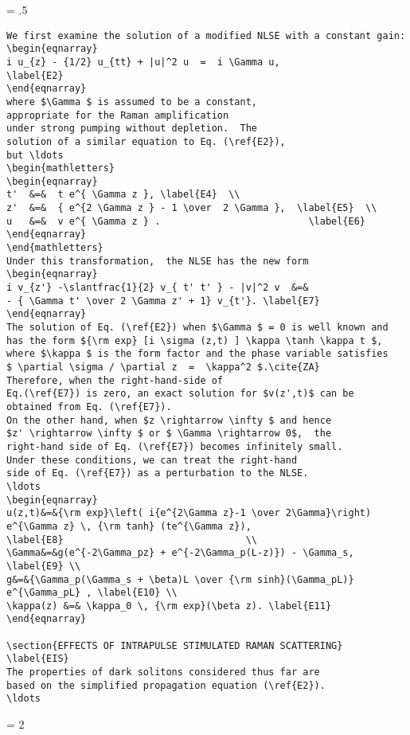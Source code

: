 \newpage
\baselineskip = .5\baselineskip  %
\begin{verbatim}
We first examine the solution of a modified NLSE with a constant gain:
\begin{eqnarray}
i u_{z} - {1/2} u_{tt} + |u|^2 u  =  i \Gamma u,
\label{E2}
\end{eqnarray}
where $\Gamma $ is assumed to be a constant,
appropriate for the Raman amplification
under strong pumping without depletion.  The
solution of a similar equation to Eq. (\ref{E2}),
but \ldots
\begin{mathletters}
\begin{eqnarray}
t'  &=&  t e^{ \Gamma z }, \label{E4}  \\
z'  &=&  { e^{2 \Gamma z } - 1 \over  2 \Gamma },  \label{E5}  \\
u   &=&  v e^{ \Gamma z } .                          \label{E6}
\end{eqnarray}
\end{mathletters}
Under this transformation,  the NLSE has the new form
\begin{eqnarray}
i v_{z'} -\slantfrac{1}{2} v_{ t' t' } - |v|^2 v  &=&
- { \Gamma t' \over 2 \Gamma z' + 1} v_{t'}. \label{E7}
\end{eqnarray}
The solution of Eq. (\ref{E2}) when $\Gamma $ = 0 is well known and
has the form ${\rm exp} [i \sigma (z,t) ] \kappa \tanh \kappa t $,
where $\kappa $ is the form factor and the phase variable satisfies
$ \partial \sigma / \partial z  =  \kappa^2 $.\cite{ZA}
Therefore, when the right-hand-side of
Eq.(\ref{E7}) is zero, an exact solution for $v(z',t)$ can be
obtained from Eq. (\ref{E7}).
On the other hand, when $z \rightarrow \infty $ and hence
$z' \rightarrow \infty $ or $ \Gamma \rightarrow 0$,  the
right-hand side of Eq. (\ref{E7}) becomes infinitely small.
Under these conditions, we can treat the right-hand
side of Eq. (\ref{E7}) as a perturbation to the NLSE.
\ldots
\begin{eqnarray}
u(z,t)&=&{\rm exp}\left( i{e^{2\Gamma z}-1 \over 2\Gamma}\right)
e^{\Gamma z} \, {\rm tanh} (te^{\Gamma z}),
\label{E8}                                \\
\Gamma&=&g(e^{-2\Gamma_pz} + e^{-2\Gamma_p(L-z)}) - \Gamma_s,
\label{E9} \\
g&=&{\Gamma_p(\Gamma_s + \beta)L \over {\rm sinh}(\Gamma_pL)}
e^{\Gamma_pL} , \label{E10} \\
\kappa(z) &=& \kappa_0 \, {\rm exp}(\beta z). \label{E11}
\end{eqnarray}

\section{EFFECTS OF INTRAPULSE STIMULATED RAMAN SCATTERING}
\label{EIS}
The properties of dark solitons considered thus far are
based on the simplified propagation equation (\ref{E2}).
\ldots

\end{verbatim}
\newpage
\baselineskip = 2\baselineskip  %

